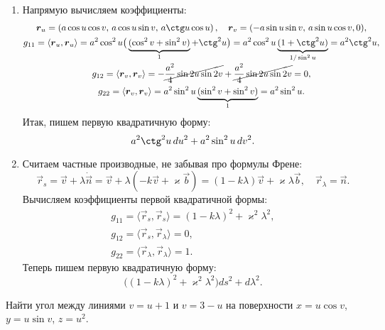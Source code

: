 \begin{solution}
	\begin{enumerate}[nolistsep, label=(\arabic*)]
		\item Напрямую вычисляем коэффициенты\footnotemark:
			\begin{gather*}
				\vec{r}_u = \br{a\cos u\cos v,\,a\cos u\sin v,\,a\ctg u\cos u},\quad \vec{r}_v = (-a\sin u\sin v,\,a\sin u\cos v, 0),\\
				g_{11} = \langle\vec{r}_u, \vec{r}_u\rangle = a^2\cos^2u\big(\underbrace{(\cos^2v + \sin^2v)}_1 + \ctg^2u\big) = a^2\cos^2u\underbrace{(1 + \ctg^2u)}_{1 / \sin^2u} = a^2\ctg^2u,\\
				g_{12} = \langle\vec{r}_v, \vec{r}_v\rangle = -\cancel{\frac{a^2}{4}\sin2u\sin2v} + \cancel{\frac{a^2}{4}\sin2u\sin2v} = 0,\\
				g_{22} = \langle\vec{r}_v, \vec{r}_v\rangle = a^2\sin^2u\underbrace{(\sin^2v + \sin^2v)}_1 = a^2\sin^2u.
			\end{gather*}
			Итак, пишем первую квадратичную форму:
			\[
				a^2\ctg^2u\,du^2 + a^2\sin^2u\,dv^2.
			\]
		\item Считаем частные производные, не забывая про формулы Френе:
			\[
				\vec{r}_s = \vec{v} + \lambda\dot{\vec{n}} = \vec{v} + \lambda(-k\vec{v} + \varkappa\vec{b}) = (1 - k\lambda)\vec{v} + \varkappa\lambda\vec{b},\quad \vec{r}_\lambda = \vec{n}.
			\]
			Вычисляем коэффициенты первой квадратичной формы:
			\begin{gather*}
				g_{11} = \langle\vec{r}_s, \vec{r}_s\rangle = (1 - k\lambda)^2 + \varkappa^2\lambda^2,\\
				g_{12} = \langle\vec{r}_s, \vec{r}_\lambda\rangle = 0,\\
				g_{22} = \langle\vec{r}_\lambda, \vec{r}_\lambda\rangle = 1.
			\end{gather*}
			Теперь пишем первую квадратичную форму:
			\[
				\big((1 - k\lambda)^2 + \varkappa^2\lambda^2\big)ds^2 + d\lambda^2.
			\]
	\end{enumerate}
\end{solution}

\begin{problem}
	Найти угол между линиями $v = u + 1$ и $v = 3 - u$ на поверхности $x = u\cos v$, $y = u\sin v$, $z = u^2$.
\end{problem}

